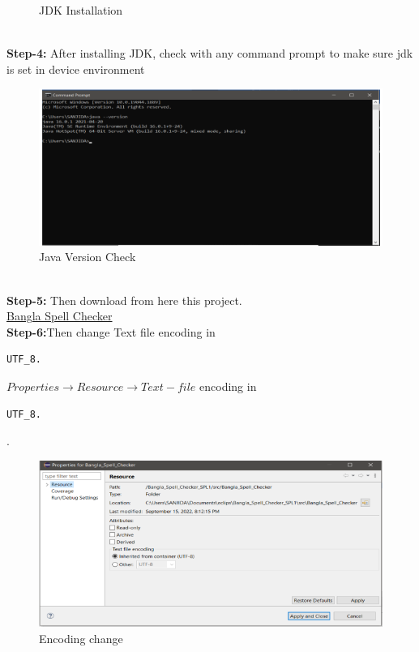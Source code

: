 \documentclass[12pt,letterpaper]{article}
\begin{document}
\begin{flushleft}
\begin{figure}[h]
    \caption{JDK Installation}
    \label{fig:myfigure}
\end{figure} \\
\textbf{Step-4:}
After installing JDK, check with any command prompt to make sure jdk is set in 
device environment
\begin{figure}[h]
    \centering
    \includegraphics[scale=0.8]{version.png}
    \caption{Java Version Check}
    \label{fig:myfigure}
\end{figure} \\
\textbf{Step-5:}
Then download from here this project.\\
\href{https://github.com/Hima0X2/Bangla_Spell_Checker}{Bangla Spell Checker} \\
\textbf{Step-6:}Then change Text file encoding in 
\begin{verbatim}
UTF_8.
\end{verbatim}
$Properties \to Resource \to Text-file$ encoding in \begin{verbatim}
UTF_8.
\end{verbatim}.
\begin{figure}[h]
    \centering
    \includegraphics[scale=0.8]{properties.png}
    \caption{Encoding change}
    \label{fig:myfigure}
\end{figure} 
\vspace{0.1cm}

\end{flushleft}
\end{document}
